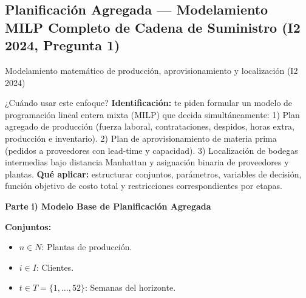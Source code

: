 \clearpage
\subsection[PA: Modelo MILP (I2 2024)]{Planificación Agregada --- Modelamiento MILP Completo de Cadena de Suministro (I2 2024, Pregunta 1)}

\begin{ejercicio}{Modelamiento matemático de producción, aprovisionamiento y localización (I2 2024)}

\begin{tipprueba}{¿Cuándo usar este enfoque?}
\textbf{Identificación:} te piden formular un modelo de programación lineal entera mixta (MILP) que decida simultáneamente:
1) Plan agregado de producción (fuerza laboral, contrataciones, despidos, horas extra, producción e inventario).
2) Plan de aprovisionamiento de materia prima (pedidos a proveedores con lead-time y capacidad).
3) Localización de bodegas intermedias bajo distancia Manhattan y asignación binaria de proveedores y plantas.
\textbf{Qué aplicar:} estructurar conjuntos, parámetros, variables de decisión, función objetivo de costo total y restricciones correspondientes por etapas.
\end{tipprueba}

\textbf{Parte i) Modelo Base de Planificación Agregada}

\textbf{Conjuntos:}
\begin{itemize}[leftmargin=1.4em, itemsep=0pt]
  \item $n \in N$: Plantas de producción.
  \item $i \in I$: Clientes.
  \item $t \in T = \{1, \dots, 52\}$: Semanas del horizonte.
\end{itemize}


\end{ejercicio}

